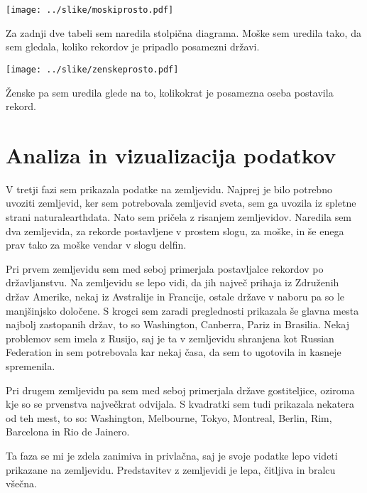 \documentclass[11pt,a4paper]{article}
\begin{document}
\texttt{[image: ../slike/moskiprosto.pdf]}

Za zadnji dve tabeli sem naredila stolpična diagrama. Moške sem uredila tako, da sem gledala, koliko rekordov je pripadlo posamezni državi.

\texttt{[image: ../slike/zenskeprosto.pdf]}

Ženske pa sem uredila glede na to, kolikokrat je posamezna oseba postavila rekord.
\section{Analiza in vizualizacija podatkov}

V tretji fazi sem prikazala podatke na zemljevidu. Najprej je bilo potrebno uvoziti zemljevid, ker sem potrebovala zemljevid sveta, sem ga uvozila iz spletne strani naturalearthdata. Nato sem pričela z risanjem zemljevidov. Naredila sem dva zemljevida, za rekorde postavljene v prostem slogu, za moške, in še enega prav tako za moške vendar v slogu delfin. 



Pri prvem zemljevidu sem med seboj primerjala postavljalce rekordov po državljanstvu. Na zemljevidu se lepo vidi, da jih največ prihaja iz Združenih držav Amerike, nekaj iz Avstralije in Francije, ostale države v naboru pa so le manjšinjsko določene. S krogci sem zaradi preglednosti prikazala še glavna mesta najbolj zastopanih držav, to so Washington, Canberra, Pariz in Brasilia. Nekaj problemov sem imela z Rusijo, saj je ta v zemljevidu shranjena kot Russian Federation in sem potrebovala kar nekaj časa, da sem to ugotovila in kasneje spremenila. 


Pri drugem zemljevidu pa sem med seboj primerjala države gostiteljice, oziroma kje so se prvenstva največkrat odvijala. S kvadratki sem tudi prikazala nekatera od teh mest, to so: Washington, Melbourne, Tokyo, Montreal, Berlin, Rim, Barcelona in Rio de Jainero. 

Ta faza se mi je zdela zanimiva in privlačna, saj je svoje podatke lepo videti prikazane na zemljevidu. Predstavitev z zemljevidi je lepa, čitljiva in bralcu všečna. 
\end{document}
